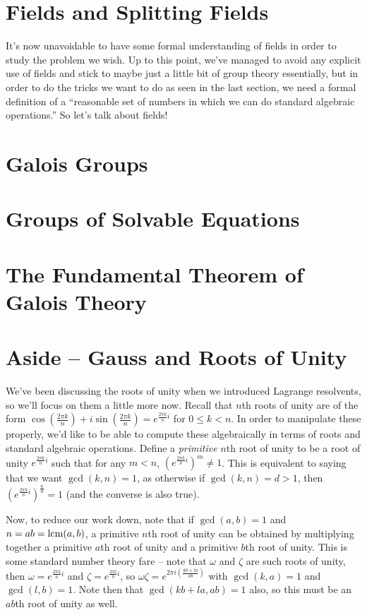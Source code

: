 \documentclass[12pt]{scrartcl}
\begin{document}
\section{Fields and Splitting Fields}
It's now unavoidable to have some formal understanding of fields in order to study the problem we wish. Up to this point, we've managed to avoid any explicit use of fields and stick to maybe just a little bit of group theory essentially, but in order to do the tricks we want to do as seen in the last section, we need a formal definition of a ``reasonable set of numbers in which we can do standard algebraic operations.'' So let's talk about fields! 


\section{Galois Groups}


\section{Groups of Solvable Equations}



\section{The Fundamental Theorem of Galois Theory}

\section{Aside -- Gauss and Roots of Unity}
We've been discussing the roots of unity when we introduced Lagrange resolvents, so we'll focus on them a little more now. Recall that $n$th roots of unity are of the form $\cos\left(\frac{2\pi k} n \right) + i \sin \left( \frac{2\pi k} n \right) = e^{\frac{2\pi k}n i}$ for $0 \leq k < n$. In order to manipulate these properly, we'd like to be able to compute these algebraically in terms of roots and standard algebraic operations. Define a \textit{primitive} $n$th root of unity to be a root of unity $e^{\frac{2\pi k}n i}$ such that for any $m < n$, $(e^{\frac{2\pi k}n i})^m \neq 1$. This is equivalent to saying that we want $\gcd(k, n) = 1$, as otherwise if $\gcd(k, n) = d > 1$, then $(e^{\frac{2\pi k}n i})^{\frac n d} = 1$ (and the converse is also true). 

Now, to reduce our work down, note that if $\gcd(a, b) = 1$ and $n = ab = \operatorname*{lcm}(a, b)$, a primitive $n$th root of unity can be obtained by multiplying together a primitive $a$th root of unity and a primitive $b$th root of unity. This is some standard number theory fare -- note that $\omega$ and $\zeta$ are such roots of unity, then $\omega = e^{\frac{2\pi k}a i}$ and $\zeta = e^{\frac{2\pi l}b i}$, so $\omega \zeta = e^{2\pi i (\frac {kb + la}{ab})}$ with $\gcd(k, a) = 1$ and $\gcd(l, b) = 1$. Note then that $\gcd(kb + la, ab) = 1$ also, so this must be an $ab$th root of unity as well. 
\end{document}
